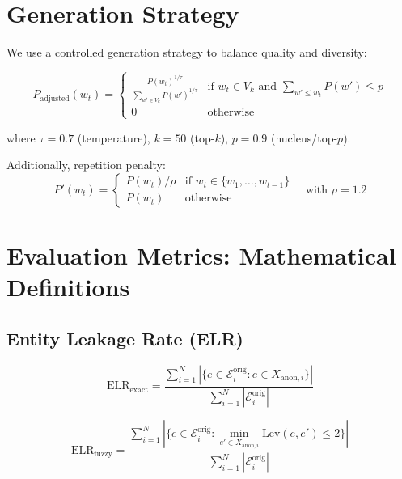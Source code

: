 \documentclass[11pt, a4paper]{article}
\begin{document}
\section{Generation Strategy}

We use a controlled generation strategy to balance quality and diversity:

\begin{equation}
P_{\text{adjusted}}(w_t) = \begin{cases}
\frac{P(w_t)^{1/\tau}}{\sum_{w' \in V_k} P(w')^{1/\tau}} & \text{if } w_t \in V_k \text{ and } \sum_{w' \leq w_t} P(w') \leq p \\
0 & \text{otherwise}
\end{cases}
\end{equation}

where $\tau = 0.7$ (temperature), $k = 50$ (top-$k$), $p = 0.9$ (nucleus/top-$p$).

Additionally, repetition penalty:
\begin{equation}
P'(w_t) = \begin{cases}
P(w_t) / \rho & \text{if } w_t \in \{w_1, \ldots, w_{t-1}\} \\
P(w_t) & \text{otherwise}
\end{cases}
\quad \text{with } \rho = 1.2
\end{equation}

\section{Evaluation Metrics: Mathematical Definitions}

\subsection{Entity Leakage Rate (ELR)}
\begin{equation}
\text{ELR}_{\text{exact}} = \frac{\sum_{i=1}^{N} |\{e \in \mathcal{E}_i^{\text{orig}} : e \in X_{\text{anon},i}\}|}{\sum_{i=1}^{N} |\mathcal{E}_i^{\text{orig}}|}
\end{equation}

\begin{equation}
\text{ELR}_{\text{fuzzy}} = \frac{\sum_{i=1}^{N} |\{e \in \mathcal{E}_i^{\text{orig}} : \min_{e' \in X_{\text{anon},i}} \text{Lev}(e, e') \leq 2\}|}{\sum_{i=1}^{N} |\mathcal{E}_i^{\text{orig}}|}
\end{equation}
\end{document}
